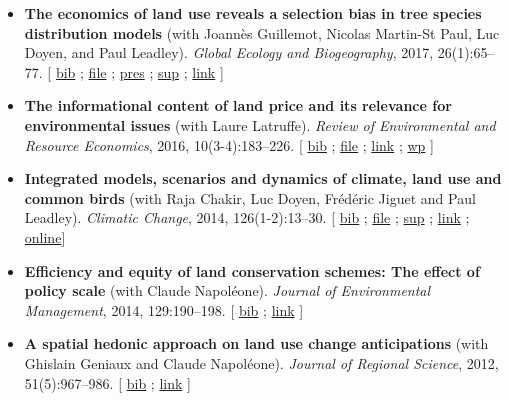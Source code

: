 \documentclass[11pt, a4paper]{./style}
\begin{document}
\begin{itemize}
\item \textbf{The economics of land use reveals a selection bias in tree
species distribution models} (with Joannès Guillemot, Nicolas
Martin-St Paul, Luc Doyen, and Paul Leadley). \emph{Global Ecology and
Biogeography}, 2017, 26(1):65--77. [ \href{bib/NTSDM.bib}{bib} ; \href{doc/NTSDM-FILE.pdf}{file} ; \href{doc/NTSDM-PRES.pdf}{pres} ; \href{doc/NTSDM-SUP.pdf}{sup} ;
\href{https://onlinelibrary.wiley.com/doi/abs/10.1111/geb.12514}{link} ]
\item \textbf{The informational content of land price and its relevance for
environmental issues} (with Laure Latruffe). \emph{Review of
Environmental and Resource Economics}, 2016, 10(3-4):183--226. [
\href{bib/RLP.bib}{bib} ; \href{doc/RLP-FILE.pdf}{file} ; \href{https://www.nowpublishers.com/article/Details/IRERE-0086}{link} ; \href{http://www.ceps.be/book/empirical-content-present-value-model-survey-instrumental-uses-farmland-prices.html}{wp} ]
\item \textbf{Integrated models, scenarios and dynamics of climate, land use
and common birds} (with Raja Chakir, Luc Doyen, Frédéric Jiguet
and Paul Leadley). \emph{Climatic Change}, 2014, 126(1-2):13--30. [
\href{bib/CILE.bib}{bib} ; \href{doc/CILE-FILE.pdf}{file} ; \href{doc/CILE-SUP.pdf}{sup} ; \href{https://link.springer.com/article/10.1007/s10584-014-1202-4}{link} ; \href{https://mobilis-a4ac2.firebaseapp.com/index.html}{online}]
\item \textbf{Efficiency and equity of land conservation schemes: The effect
of policy scale} (with Claude Napoléone). \emph{Journal of
Environmental Management}, 2014, 129:190--198. [ \href{bib/EELC.bib}{bib} ; \href{http://www.sciencedirect.com/science/article/pii/S0301479713004829}{link} ]
\item \textbf{A spatial hedonic approach on land use change anticipations}
(with Ghislain Geniaux and Claude Napoléone). \emph{Journal of
Regional Science}, 2012, 51(5):967--986. [ \href{bib/SPHED.bib}{bib} ; \href{http://onlinelibrary.wiley.com/doi/10.1111/j.1467-9787.2011.00721.x/abstract}{link} ]
\end{itemize}

\label{sec:org7d27667}
\end{document}
